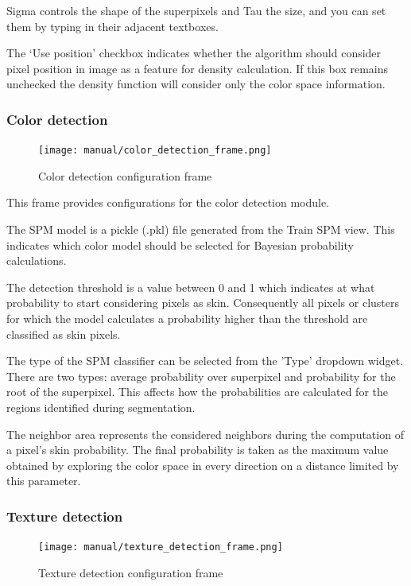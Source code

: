 \documentclass[12pt]{report}
\begin{document}
	Sigma controls the shape of the superpixels and Tau the size, and you can set them by typing in their adjacent textboxes. 
	
	The ‘Use position’ checkbox indicates whether the algorithm should consider pixel position in image as a feature for density calculation. If this box remains unchecked the density function will consider only the color space information.
	
	\subsubsection{Color detection}
	
	\begin{figure}
		\begin{center}
			\texttt{[image: manual/color\_detection\_frame.png]}
		\end{center}
		\caption{Color detection configuration frame}
	\end{figure}
	
	This frame provides configurations for the color detection module.
	
	The SPM model is a pickle (.pkl) file generated from the Train SPM view. This indicates which color model should be selected for Bayesian probability calculations. 
	
	The detection threshold is a value between 0 and 1 which indicates at what probability to start considering pixels as skin. Consequently all pixels or clusters for which the model calculates a probability higher than the threshold are classified as skin pixels.
	
	The type of the SPM classifier can be selected from the 'Type' dropdown widget.
	There are two types: average probability over superpixel and probability for the root of the superpixel. This affects how the probabilities are calculated for the regions identified during segmentation.
	
	The neighbor area represents the considered neighbors during the computation of a pixel's skin probability. The final probability is taken as the maximum value obtained by exploring the color space in every direction on a distance limited by this parameter. 
	
	\subsubsection{Texture detection}
	\begin{figure}
		\begin{center}
			\texttt{[image: manual/texture\_detection\_frame.png]}
		\end{center}
		\caption{Texture detection configuration frame}
	\end{figure}
	
\end{document}

